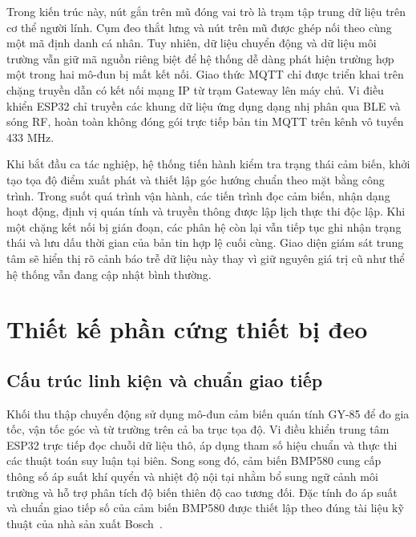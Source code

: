 Trong kiến trúc này, nút gắn trên mũ đóng vai trò là trạm tập trung dữ liệu trên cơ thể người lính. Cụm đeo thắt lưng và nút trên mũ được ghép nối theo cùng một mã định danh cá nhân. Tuy nhiên, dữ liệu chuyển động và dữ liệu môi trường vẫn giữ mã nguồn riêng biệt để hệ thống dễ dàng phát hiện trường hợp một trong hai mô-đun bị mất kết nối. Giao thức MQTT chỉ được triển khai trên chặng truyền dẫn có kết nối mạng IP từ trạm Gateway lên máy chủ. Vi điều khiển ESP32 chỉ truyền các khung dữ liệu ứng dụng dạng nhị phân qua BLE và sóng RF, hoàn toàn không đóng gói trực tiếp bản tin MQTT trên kênh vô tuyến 433 MHz.

Khi bắt đầu ca tác nghiệp, hệ thống tiến hành kiểm tra trạng thái cảm biến, khởi tạo tọa độ điểm xuất phát và thiết lập góc hướng chuẩn theo mặt bằng công trình. Trong suốt quá trình vận hành, các tiến trình đọc cảm biến, nhận dạng hoạt động, định vị quán tính và truyền thông được lập lịch thực thi độc lập. Khi một chặng kết nối bị gián đoạn, các phân hệ còn lại vẫn tiếp tục ghi nhận trạng thái và lưu dấu thời gian của bản tin hợp lệ cuối cùng. Giao diện giám sát trung tâm sẽ hiển thị rõ cảnh báo trễ dữ liệu này thay vì giữ nguyên giá trị cũ như thể hệ thống vẫn đang cập nhật bình thường.

\section{Thiết kế phần cứng thiết bị đeo}\label{sec:hardware}
\subsection{Cấu trúc linh kiện và chuẩn giao tiếp}
Khối thu thập chuyển động sử dụng mô-đun cảm biến quán tính GY-85 để đo gia tốc, vận tốc góc và từ trường trên cả ba trục tọa độ. Vi điều khiển trung tâm ESP32 trực tiếp đọc chuỗi dữ liệu thô, áp dụng tham số hiệu chuẩn và thực thi các thuật toán suy luận tại biên. Song song đó, cảm biến BMP580 cung cấp thông số áp suất khí quyển và nhiệt độ nội tại nhằm bổ sung ngữ cảnh môi trường và hỗ trợ phân tích độ biến thiên độ cao tương đối. Đặc tính đo áp suất và chuẩn giao tiếp số của cảm biến BMP580 được thiết lập theo đúng tài liệu kỹ thuật của nhà sản xuất Bosch~\cite{bmp580}.

